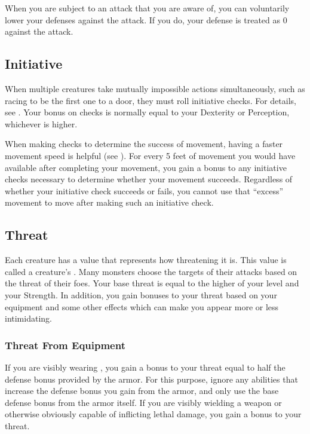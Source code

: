              When you are subject to an attack that you are aware of, you can voluntarily lower your defenses against the attack.
            If you do, your defense is treated as 0 against the attack.

    \subsection{Initiative}\label{Initiative}
        When multiple creatures take mutually impossible actions simultaneously, such as racing to be the first one to a door, they must roll initiative checks.
        For details, see .
        Your bonus on  checks is normally equal to your Dexterity or Perception, whichever is higher.

        \label{Movement-Based Initiative}
        When making  checks to determine the success of movement, having a faster movement speed is helpful (see ).
        For every 5 feet of movement you would have available after completing your movement, you gain a  bonus to any initiative checks necessary to determine whether your movement succeeds.
        Regardless of whether your initiative check succeeds or fails, you cannot use that ``excess'' movement to move after making such an initiative check.

    \subsection{Threat}\label{Threat}
        Each creature has a value that represents how threatening it is.
        This value is called a creature's .
        Many monsters choose the targets of their attacks based on the threat of their foes.
        Your base threat is equal to the higher of your level and your Strength.
        In addition, you gain bonuses to your threat based on your equipment and some other effects which can make you appear more or less intimidating.

        \subsubsection{Threat From Equipment}
            If you are visibly wearing , you gain a bonus to your threat equal to half the defense bonus provided by the armor.
            For this purpose, ignore any abilities that increase the defense bonus you gain from the armor, and only use the base defense bonus from the armor itself.
            If you are visibly wielding a weapon or otherwise obviously capable of inflicting lethal damage, you gain a  bonus to your threat.

